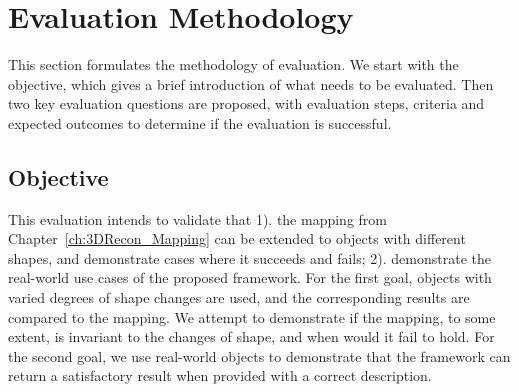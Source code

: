 
\section{Evaluation Methodology}
\label{sec:interp_eval_methodology}
This section formulates the methodology of evaluation. We start with the objective, which gives a brief introduction of what needs to be evaluated. Then two key evaluation questions are proposed, with evaluation steps, criteria and expected outcomes to determine if the evaluation is successful.

\subsection{Objective}
This evaluation intends to validate that 1). the mapping from Chapter~\ref{ch:3DRecon_Mapping} can be extended to objects with different shapes, and demonstrate cases where it succeeds and fails; 2). demonstrate the real-world use cases of the proposed framework. For the first goal, objects with varied degrees of shape changes are used, and the corresponding results are compared to the mapping. We attempt to demonstrate if the mapping, to some extent, is invariant to the changes of shape, and when would it fail to hold. For the second goal, we use real-world objects to demonstrate that the framework can return a satisfactory result when provided with a correct description.



